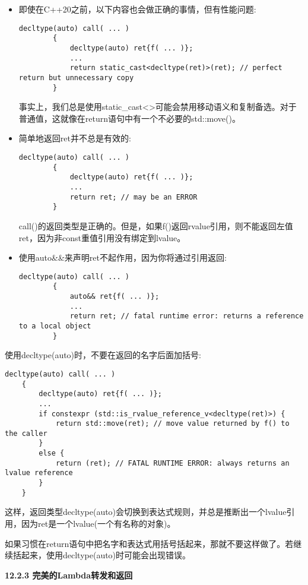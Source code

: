 \begin{itemize}
	\item 即使在C++20之前，以下内容也会做正确的事情，但有性能问题:\par
	\begin{lstlisting}[caption={}]
		decltype(auto) call( ... )
		{
			decltype(auto) ret{f( ... )};
			...
			return static_cast<decltype(ret)>(ret); // perfect return but unnecessary copy
		}
	\end{lstlisting}
	事实上，我们总是使用static\_cast<>可能会禁用移动语义和复制备选。对于普通值，这就像在return语句中有一个不必要的std::move()。
	\item 简单地返回ret并不总是有效的:
	\begin{lstlisting}[caption={}]
		decltype(auto) call( ... )
		{
			decltype(auto) ret{f( ... )};
			...
			return ret; // may be an ERROR
		}
	\end{lstlisting}
	call()的返回类型是正确的。但是，如果f()返回rvalue引用，则不能返回左值ret，因为非const重值引用没有绑定到lvalue。
	\item 使用auto\&\&来声明ret不起作用，因为你将通过引用返回:
	\begin{lstlisting}[caption={}]
		decltype(auto) call( ... )
		{
			auto&& ret{f( ... )};
			...
			return ret; // fatal runtime error: returns a reference to a local object
		}
	\end{lstlisting}
\end{itemize}

使用decltype(auto)时，不要在返回的名字后面加括号:\par

\begin{lstlisting}[caption={}]
	decltype(auto) call( ... )
	{
		decltype(auto) ret{f( ... )};
		...
		if constexpr (std::is_rvalue_reference_v<decltype(ret)>) {
			return std::move(ret); // move value returned by f() to the caller
		}
		else {
			return (ret); // FATAL RUNTIME ERROR: always returns an lvalue reference
		}
	}
\end{lstlisting}

这样，返回类型decltype(auto)会切换到表达式规则，并总是推断出一个lvalue引用，因为ret是一个lvalue(一个有名称的对象)。\par

如果习惯在return语句中把名字和表达式用括号括起来，那就不要这样做了。若继续括起来，使用decltype(auto)时可能会出现错误。\par

\hspace*{\fill} \par %
\textbf{12.2.3 完美的Lambda转发和返回}

